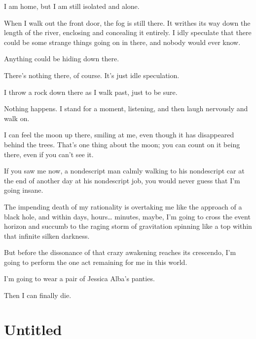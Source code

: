 I am home, but I am still isolated and alone.



When I walk out the front door, the fog is still there. It writhes
its way down the length of the river, enclosing and concealing it
entirely. I idly speculate that there could be some strange things
going on in there, and nobody would ever know.



Anything could be hiding down there.



There's nothing there, of course. It's just idle
speculation.



I throw a rock down there as I walk past, just to be sure.



Nothing happens. I stand for a moment, listening, and then laugh
nervously and walk on.



I can feel the moon up there, smiling at me, even though it has
disappeared behind the trees. That's one thing about the
moon; you can count on it being there, even if you can't see
it.



If you saw me now, a nondescript man calmly walking to his
nondescript car at the end of another day at his nondescript job,
you would never guess that I'm going insane.



The impending death of my rationality is overtaking me like the
approach of a black hole, and within days, hours{\ldots} minutes,
maybe, I'm going to cross the event horizon and succumb to
the raging storm of gravitation spinning like a top within that
infinite silken darkness.



But before the dissonance of that crazy awakening reaches its
crescendo, I'm going to perform the one act remaining for me
in this world.



I'm going to wear a pair of Jessica Alba's
panties.



Then I can finally die. 
 



\chapter{Untitled}


